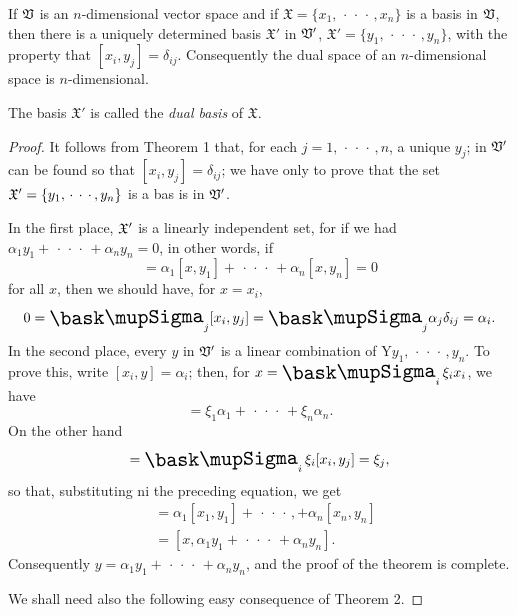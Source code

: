 \begin{theorem}
    If \(\mathfrak{V}\) is an \(n\)-dimensional vector space and if \(\mathfrak{X} =
    \{x_1, \,\cdot\,\cdot\,\cdot\,, x_n\}\) is a basis in \(\mathfrak{V}\), then there
    is a uniquely determined basis \(\mathfrak{X}'\) in \(\mathfrak{V}'\),
    \(\mathfrak{X}' = \{y_1, \,\cdot\,\cdot\,\cdot\,, y_n\}\), with the property
    that \([x_i, y_j] = \delta_{ij}\). Consequently the dual space of an
    \(n\)-dimensional space is \(n\)-dimensional.

    The basis \(\mathfrak{X}'\) is called the \emph{dual basis} of
    \(\mathfrak{X}\).
\end{theorem}

\begin{proof}
    It follows from Theorem 1 that, for each \(j = 1, \,\cdot\,\cdot\,\cdot\,,
    n\), a unique \(y_j\); in \(\mathfrak{V}'\) can be found so that \([x_i, y_j] =
    \delta_{ij}\); we have only to prove that the set \(\mathfrak{X}' = \{y_1,
    \,\cdot\,\cdot\,\cdot\,, y_n\}\) is a bas is in \(\mathfrak{V}'\).
    
    In the first place, \(\mathfrak{X}'\) is a linearly independent set, for if we
    had \(\alpha_1 y_1 + \,\cdot\,\cdot\,\cdot\, + \alpha_n y_n = 0\), in other
    words, if
    \begin{equation*}
        [x, \alpha_1 y_1 + \,\cdot\,\cdot\,\cdot\, + \alpha_n y_n] = \alpha_1 [x, y_1] + \,\cdot\,\cdot\,\cdot\, + \alpha_n [x, y_n] = 0
    \end{equation*}
    for all \(x\), then we should have, for \(x = x_i\),
    \begin{equation*}
        0 = {\textstyle \sumx_j} [x_i, y_j] = {\textstyle \sumx_j} \alpha_j\delta_{ij} = \alpha_i.
    \end{equation*}
    In the second place, every \(y\) in \(\mathfrak{V}'\) is a linear combination of
    Y\(y_1, \,\cdot\,\cdot\,\cdot\,, y_n\). To prove this, write \([x_i, y] =
    \alpha_i\); then, for \(x = \sumx_i \xi_i x_i\), we have
    \begin{equation*}
        [x, y] = \xi_1 \alpha_1 + \,\cdot\,\cdot\,\cdot\, + \xi_n \alpha_n.
    \end{equation*}
    On the other hand
    \begin{equation*}
        [x, y_j] = \sumx_i \xi_i [x_i , y_j] = \xi_j,
    \end{equation*}
    so that, substituting ni the preceding equation, we get
    \begin{align*}
        [x, y] & = \alpha_1[x_1, y_1] + \,\cdot\,\cdot\,\cdot\,, + \alpha_n[x_n, y_n] \\
        & = [x, \alpha_1 y_1 + \,\cdot\,\cdot\,\cdot\, + \alpha_n y_n].
    \end{align*}
    Consequently \(y = \alpha_1 y_1 + \,\cdot\,\cdot\,\cdot\, + \alpha_n y_n\),
    and the proof of the theorem is complete.
    
    We shall need also the following easy consequence of Theorem 2.
\end{proof}

